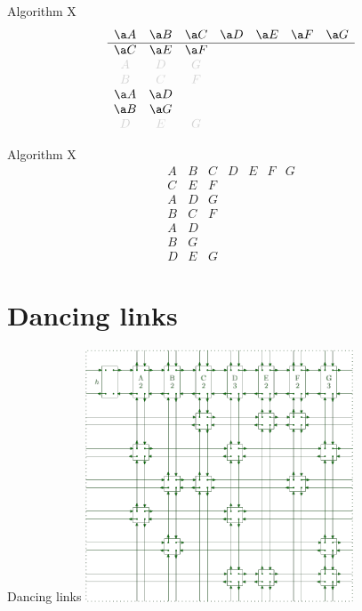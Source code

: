 \documentclass[xcolor=svgnames]{beamer}
\begin{document}
%
\begin{frame}{Algorithm X}
\Large\boldmath
$$
  \begin{array}{ccccccc}
    \a A & \a B & \a C & \a D & \a E & \a F & \a G\\
    \hline
    \a C & \a E & \a F &&&&\\
    \lg A & \lg D & \lg G &&&&\\
    \lg B & \lg C & \lg F &&&&\\
    \a A & \a D &&&&&\\
    \a B & \a G &&&&&\\
    \lg D & \lg E & \lg G &&&&
  \end{array}
  $$
\end{frame}

%
\begin{frame}{Algorithm X}
\Large\boldmath
  $$
  \begin{array}{ccccccc}
    A & B & C & D & E & F & G\\
    \hline
    C & E & F &&&&\\
    A & D & G &&&&\\
    B & C & F &&&&\\
    A & D &&&&&\\
    B & G &&&&&\\
    D & E & G &&&&
  \end{array}
  $$
\end{frame}


\section{Dancing links}

%
\begin{frame}{Dancing links}
  \centering\includegraphics[height=7.5cm]{imgs/cdance-2.png}
\end{frame}
\end{document}
